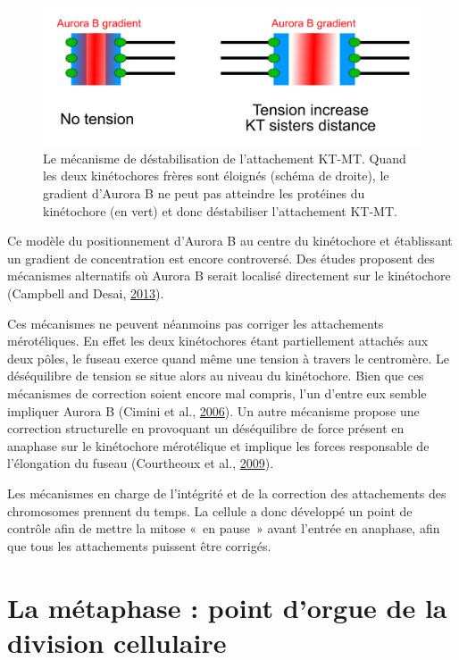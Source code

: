 \documentclass[12pt,a4paper,twoside,openright]{book}
\begin{document}
\begin{figure}[htbp]
\centering
\includegraphics{figures/intro/aurora.png}
\caption[Le mécanisme de déstabilisation de l'attachement KT-MT]{\label{fig:aurora}Le
mécanisme de déstabilisation de l'attachement KT-MT. Quand les deux
kinétochores frères sont éloignés (schéma de droite), le gradient
d'Aurora B ne peut pas atteindre les protéines du kinétochore (en vert)
et donc déstabiliser l'attachement KT-MT.}
\end{figure}

Ce modèle du positionnement d'Aurora B au centre du kinétochore et
établissant un gradient de concentration est encore controversé. Des
études proposent des mécanismes alternatifs où Aurora B serait localisé
directement sur le kinétochore (Campbell and Desai,
\protect\hyperlink{ref-Campbell2013a}{2013}).

Ces mécanismes ne peuvent néanmoins pas corriger les attachements
mérotéliques. En effet les deux kinétochores étant partiellement
attachés aux deux pôles, le fuseau exerce quand même une tension à
travers le centromère. Le déséquilibre de tension se situe alors au
niveau du kinétochore. Bien que ces mécanismes de correction soient
encore mal compris, l'un d'entre eux semble impliquer Aurora B (Cimini
et al., \protect\hyperlink{ref-Cimini2006}{2006}). Un autre mécanisme
propose une correction structurelle en provoquant un déséquilibre de
force présent en anaphase sur le kinétochore mérotélique et implique les
forces responsable de l'élongation du fuseau (Courtheoux et al.,
\protect\hyperlink{ref-Courtheoux2009}{2009}).

Les mécanismes en charge de l'intégrité et de la correction des
attachements des chromosomes prennent du temps. La cellule a donc
développé un point de contrôle afin de mettre la mitose «~en pause~»
avant l'entrée en anaphase, afin que tous les attachements puissent être
corrigés.

\section{La métaphase : point d'orgue de la division
cellulaire}\label{la-muxe9taphase-point-dorgue-de-la-division-cellulaire}
\end{document}
